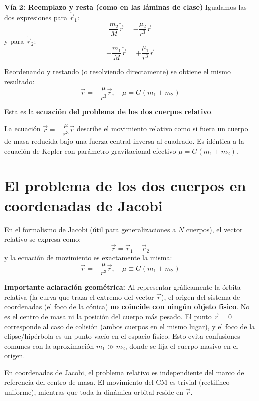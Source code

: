 \textbf{Vía 2: Reemplazo y resta (como en las láminas de clase)}
Igualamos las dos expresiones para \(\ddot{\vec{r}}_1\):
\[
\frac{m_2}{M} \ddot{\vec{r}} = -\frac{\mu_2}{r^3} \vec{r}
\]
y para \(\ddot{\vec{r}}_2\):
\[
-\frac{m_1}{M} \ddot{\vec{r}} = +\frac{\mu_1}{r^3} \vec{r}
\]

Reordenando y restando (o resolviendo directamente) se obtiene el mismo resultado:
\[
\ddot{\vec{r}} = -\frac{\mu}{r^3} \vec{r}, \quad \mu = G(m_1 + m_2)
\]

Esta es la \textbf{ecuación del problema de los dos cuerpos relativo}.

\begin{importante}
La ecuación \(\ddot{\vec{r}} = -\dfrac{\mu}{r^3} \vec{r}\) describe el movimiento relativo como si fuera un cuerpo de masa reducida bajo una fuerza central inversa al cuadrado. Es idéntica a la ecuación de Kepler con parámetro gravitacional efectivo \(\mu = G(m_1 + m_2)\).
\end{importante}

\section{El problema de los dos cuerpos en coordenadas de Jacobi}
En el formalismo de Jacobi (útil para generalizaciones a \(N\) cuerpos), el vector relativo se expresa como:
\[
\vec{r} = \vec{r}_1 - \vec{r}_2
\]
y la ecuación de movimiento es exactamente la misma:
\[
\ddot{\vec{r}} = -\frac{\mu}{r^3} \vec{r}, \quad \mu \equiv G(m_1 + m_2)
\]

\textbf{Importante aclaración geométrica:}  
Al representar gráficamente la órbita relativa (la curva que traza el extremo del vector \(\vec{r}\)), el origen del sistema de coordenadas (el foco de la cónica) \textbf{no coincide con ningún objeto físico}. No es el centro de masa ni la posición del cuerpo más pesado. El punto \( \vec{r} = 0 \) corresponde al caso de colisión (ambos cuerpos en el mismo lugar), y el foco de la elipse/hipérbola es un punto vacío en el espacio físico. Esto evita confusiones comunes con la aproximación \(m_1 \gg m_2\), donde se fija el cuerpo masivo en el origen.

\begin{importante}
En coordenadas de Jacobi, el problema relativo es independiente del marco de referencia del centro de masa. El movimiento del CM es trivial (rectilíneo uniforme), mientras que toda la dinámica orbital reside en \(\vec{r}\).
\end{importante}

